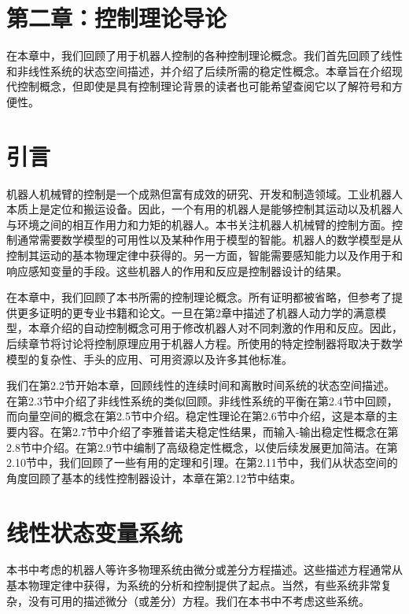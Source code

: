 \documentclass[UTF8,12pt,a4paper]{ctexart}
\theoremstyle{definition}
\begin{document}
\section*{第二章：控制理论导论}

在本章中，我们回顾了用于机器人控制的各种控制理论概念。我们首先回顾了线性和非线性系统的状态空间描述，并介绍了后续所需的稳定性概念。本章旨在介绍现代控制概念，但即使是具有控制理论背景的读者也可能希望查阅它以了解符号和方便性。

\section{引言}

机器人机械臂的控制是一个成熟但富有成效的研究、开发和制造领域。工业机器人本质上是定位和搬运设备。因此，一个有用的机器人是能够控制其运动以及机器人与环境之间的相互作用力和力矩的机器人。本书关注机器人机械臂的控制方面。控制通常需要数学模型的可用性以及某种作用于模型的智能。机器人的数学模型是从控制其运动的基本物理定律中获得的。另一方面，智能需要感知能力以及作用于和响应感知变量的手段。这些机器人的作用和反应是控制器设计的结果。

在本章中，我们回顾了本书所需的控制理论概念。所有证明都被省略，但参考了提供更多证明的更专业书籍和论文。一旦在第2章中描述了机器人动力学的满意模型，本章介绍的自动控制概念可用于修改机器人对不同刺激的作用和反应。因此，后续章节将讨论将控制原理应用于机器人方程。所使用的特定控制器将取决于数学模型的复杂性、手头的应用、可用资源以及许多其他标准。

我们在第2.2节开始本章，回顾线性的连续时间和离散时间系统的状态空间描述。在第2.3节中介绍了非线性系统的类似回顾。非线性系统的平衡在第2.4节中回顾，而向量空间的概念在第2.5节中介绍。稳定性理论在第2.6节中介绍，这是本章的主要内容。在第2.7节中介绍了李雅普诺夫稳定性结果，而输入-输出稳定性概念在第2.8节中介绍。在第2.9节中编制了高级稳定性概念，以使后续发展更加简洁。在第2.10节中，我们回顾了一些有用的定理和引理。在第2.11节中，我们从状态空间的角度回顾了基本的线性控制器设计，本章在第2.12节中结束。

\section{线性状态变量系统}

本书中考虑的机器人等许多物理系统由微分或差分方程描述。这些描述方程通常从基本物理定律中获得，为系统的分析和控制提供了起点。当然，有些系统非常复杂，没有可用的描述微分（或差分）方程。我们在本书中不考虑这些系统。
\end{document}
